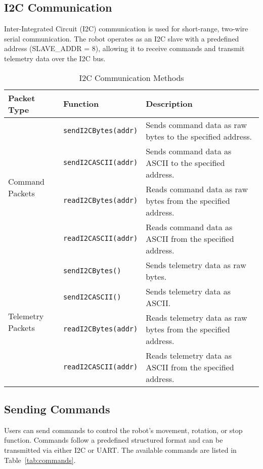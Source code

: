 \subsection{I2C Communication}
Inter-Integrated Circuit (I2C) communication is used for short-range, two-wire serial communication. The robot operates as an I2C slave with a predefined address (SLAVE\_ADDR = 8), allowing it to receive commands and transmit telemetry data over the I2C bus.

\begin{table}[h]
	\centering
	\caption{I2C Communication Methods}
	\begin{tabular}{|l|l|l|}
		\hline
		\textbf{Packet Type} & \textbf{Function} & \textbf{Description} \\ \hline
		\multirow{4}{*}{Command Packets} & \texttt{sendI2CBytes(addr)} & Sends command data as raw bytes to the specified address. \\ \cline{2-3}
		& \texttt{sendI2CASCII(addr)} & Sends command data as ASCII to the specified address. \\ \cline{2-3}
		& \texttt{readI2CBytes(addr)} & Reads command data as raw bytes from the specified address. \\ \cline{2-3}
		& \texttt{readI2CASCII(addr)} & Reads command data as ASCII from the specified address. \\ \hline
		\multirow{4}{*}{Telemetry Packets} & \texttt{sendI2CBytes()} & Sends telemetry data as raw bytes. \\ \cline{2-3}
		& \texttt{sendI2CASCII()} & Sends telemetry data as ASCII. \\ \cline{2-3}
		& \texttt{readI2CBytes(addr)} & Reads telemetry data as raw bytes from the specified address. \\ \cline{2-3}
		& \texttt{readI2CASCII(addr)} & Reads telemetry data as ASCII from the specified address. \\ \hline
	\end{tabular}
	\label{tab:i2c_methods}
\end{table}

\subsection{Sending Commands}
Users can send commands to control the robot’s movement, rotation, or stop function. Commands follow a predefined structured format and can be transmitted via either I2C or UART. The available commands are listed in Table~\ref{tab:commands}.

